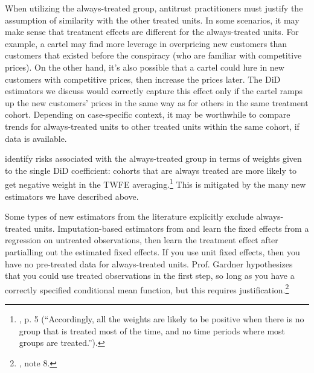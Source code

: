 \documentclass[12pt]{article}
\begin{document}
When utilizing the always-treated group, antitrust practitioners must justify the assumption of similarity with the other treated units. In some scenarios, it may make sense that treatment effects are different for the always-treated units. For example, a cartel may find more leverage in overpricing new customers than customers that existed before the conspiracy (who are familiar with competitive prices). On the other hand, it’s also possible that a cartel could lure in new customers with competitive prices, then increase the prices later. The DiD estimators we discuss would correctly capture this effect only if the cartel ramps up the new customers’ prices in the same way as for others in the same treatment cohort. Depending on case-specific context, it may be worthwhile to compare trends for always-treated units to other treated units within the same cohort, if data is available.

\citet{de2023two} identify risks associated with the always-treated group in terms of weights given to the single DiD coefficient: cohorts that are always treated are more likely to get negative weight in the TWFE averaging.\footnote{\citet{de2023two}, p. 5 (“Accordingly, all the weights are likely to be positive when there is no group that is treated most of the time, and no time periods where most groups are treated.”).}  This is mitigated by the many new estimators we have described above.

Some types of new estimators from the literature explicitly exclude always-treated units. Imputation-based estimators from \citet{borusyak2024revisiting} and \citet{gardner2022a} learn the fixed effects from a regression on untreated observations, then learn the treatment effect after partialling out the estimated fixed effects. If you use unit fixed effects, then you have no pre-treated data for always-treated units. Prof. Gardner hypothesizes that you could use treated observations in the first step, so long as you have a correctly specified conditional mean function,  but this requires justification.\footnote{\citet{gardner2022a}, note 8.}
\end{document}

